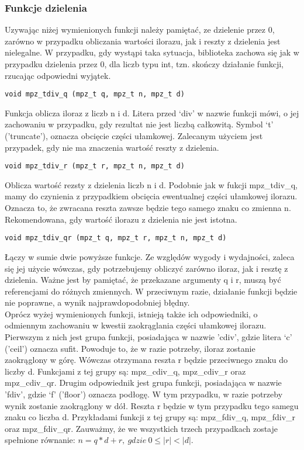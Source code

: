 \documentclass[twoside,a4paper]{book}
\begin{document}
\subsubsection{Funkcje dzielenia}
Uzywając niżej wymienionych funkcji należy pamiętać, ze dzielenie przez 0, zarówno w przypadku obliczania wartości ilorazu, jak i reszty z dzielenia jest nielegalne. W przypadku, gdy wystąpi taka sytuacja, biblioteka zachowa się jak w przypadku dzielenia przez 0, dla liczb typu int, tzn. skończy działanie funkcji, rzucając odpowiedni wyjątek.

\begin{lstlisting}
void mpz_tdiv_q (mpz_t q, mpz_t n, mpz_t d)
\end{lstlisting}

Funkcja oblicza iloraz z liczb n i d. Litera przed ‘div’ w nazwie funkcji mówi, o jej zachowaniu w przypadku, gdy rezultat nie jest liczbą całkowitą. Symbol ‘t’ ('truncate'), oznacza obcięcie części ułamkowej. Zalecanym użyciem jest przypadek, gdy nie ma znaczenia wartość reszty z dzielenia.

\begin{lstlisting}
void mpz_tdiv_r (mpz_t r, mpz_t n, mpz_t d)
\end{lstlisting}

Oblicza wartość rezsty z dzielenia liczb n i d. Podobnie jak w fukcji mpz\_tdiv\_q, mamy do czynienia z przypadkiem obcięcia ewentualnej części ułamkowej ilorazu. Oznacza to, że zwracana reszta zawsze będzie tego samego znaku co zmienna n. Rekomendowana, gdy wartość ilorazu z dzielenia nie jest istotna.

\begin{lstlisting}
void mpz_tdiv_qr (mpz_t q, mpz_t r, mpz_t n, mpz_t d)
\end{lstlisting}

Łączy w sumie dwie powyższe funkcje. Ze względów wygody i wydajności, zaleca się jej użycie wówczas, gdy potrzebujemy obliczyć zarówno iloraz, jak i resztę z dzielenia. Ważne jest by pamiętać, że przekazane argumenty q i r, muszą być referencjami do różnych zmiennych. W przeciwnym razie, działanie funkcji będzie nie poprawne, a wynik najprawdopodobniej błędny.\\
Oprócz wyżej wymienionych funkcji, istnieją także ich odpowiedniki, o odmiennym zachowaniu w kwestii zaokrąglania części ułamkowej ilorazu. Pierwszym z nich jest grupa funkcji, posiadająca w nazwie 'cdiv', gdzie litera ‘c’ ('ceil') oznacza sufit. Powoduje to, że w razie potrzeby, iloraz zostanie zaokrąglony w górę. Wówczas otrzymana reszta r będzie przeciwnego znaku do liczby d. Funkcjami z tej grupy są: mpz\_cdiv\_q, mpz\_cdiv\_r oraz mpz\_cdiv\_qr. Drugim odpowiednik jest grupa funkcji, posiadająca w nazwie 'fdiv', gdzie ‘f’ ('floor') oznacza podłogę. W tym przypadku, w razie potrzeby wynik zostanie zaokrąglony w dół. Reszta r będzie w tym przypadku tego samegu znaku co liczba d. Przykładami funkcji z tej grupy są: mpz\_fdiv\_q, mpz\_fdiv\_r oraz mpz\_fdiv\_qr. Zauważmy, że we wszystkich trzech przypadkach zostaje spełnione równanie: $n = q*d+r,\ gdzie\ 0 \le |r| < |d|.$
\end{document}
